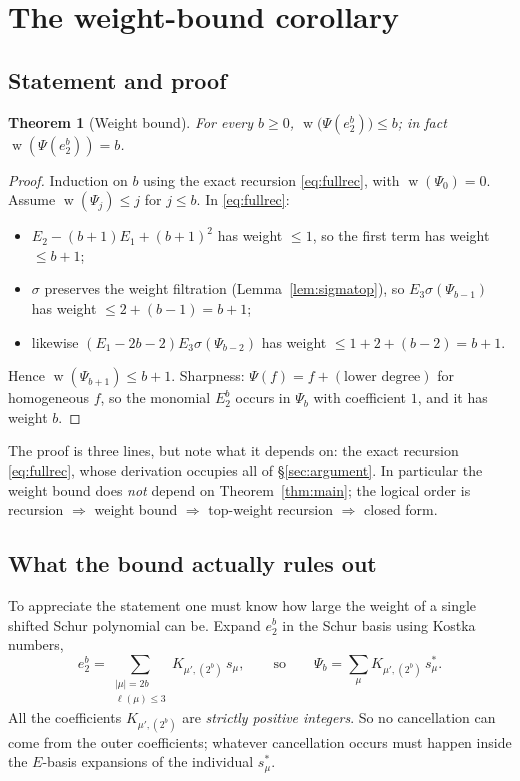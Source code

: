 \documentclass[10pt]{article}
\theoremstyle{plain}
\newtheorem{theorem}{Theorem}[section]
\theoremstyle{definition}
\newcommand{\wt}{\operatorname{w}}
\begin{document}
\section{The weight-bound corollary}\label{sec:weight}

\subsection{Statement and proof}

\begin{theorem}[Weight bound]\label{thm:weight}
For every $b\ge0$, $\wt\big(\Psi(e_2^b)\big)\le b$; in fact $\wt(\Psi(e_2^b))=b$.
\end{theorem}

\begin{proof}
Induction on $b$ using the exact recursion \eqref{eq:fullrec}, with $\wt(\Psi_0)=0$. Assume
$\wt(\Psi_j)\le j$ for $j\le b$. In \eqref{eq:fullrec}:
\begin{itemize}
\item $E_2-(b+1)E_1+(b+1)^2$ has weight $\le1$, so the first term has weight $\le b+1$;
\item $\sigma$ preserves the weight filtration (Lemma~\ref{lem:sigmatop}), so
$E_3\sigma(\Psi_{b-1})$ has weight $\le2+(b-1)=b+1$;
\item likewise $(E_1-2b-2)E_3\sigma(\Psi_{b-2})$ has weight $\le1+2+(b-2)=b+1$.
\end{itemize}
Hence $\wt(\Psi_{b+1})\le b+1$. Sharpness: $\Psi(f)=f+(\text{lower degree})$ for homogeneous
$f$, so the monomial $E_2^b$ occurs in $\Psi_b$ with coefficient $1$, and it has weight $b$.
\end{proof}

The proof is three lines, but note what it depends on: the exact recursion
\eqref{eq:fullrec}, whose derivation occupies all of \S\ref{sec:argument}. In particular
the weight bound does \emph{not} depend on Theorem~\ref{thm:main}; the logical order is
recursion $\Rightarrow$ weight bound $\Rightarrow$ top-weight recursion $\Rightarrow$ closed
form.

\subsection{What the bound actually rules out}

To appreciate the statement one must know how large the weight of a single shifted Schur
polynomial can be. Expand $e_2^b$ in the Schur basis using Kostka numbers,
\[
 e_2^b=\sum_{\substack{|\mu|=2b\\ \ell(\mu)\le3}} K_{\mu',(2^b)}\,s_\mu,
 \qquad\text{so}\qquad
 \Psi_b=\sum_\mu K_{\mu',(2^b)}\,s^*_\mu .
\]
All the coefficients $K_{\mu',(2^b)}$ are \emph{strictly positive integers}. So no
cancellation can come from the outer coefficients; whatever cancellation occurs must happen
inside the $E$-basis expansions of the individual $s^*_\mu$.
\end{document}
